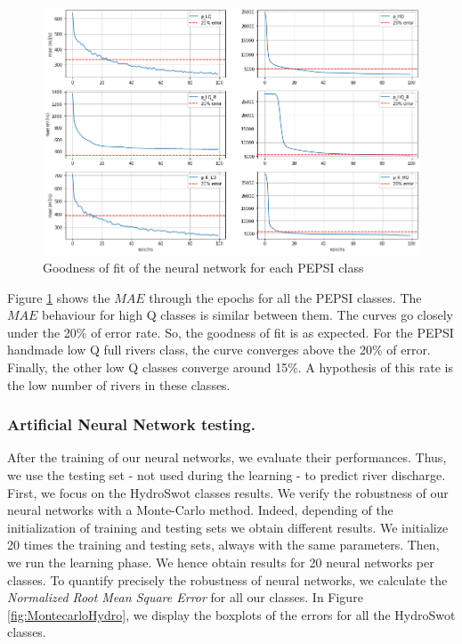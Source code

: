\begin{figure}[H]
    \centering
    \includegraphics[scale = 0.45] {Graph/mae_subplot_pepsi.png}
    \caption{Goodness of fit of the neural network for each PEPSI class}
    \label{fig:mae pepsi}
\end{figure}

Figure \ref{fig:mae pepsi} shows the $MAE$ through the epochs for all the PEPSI classes. 
The $MAE$ behaviour for high Q classes is similar between them. The curves go closely under the 20\% of error rate. So, the goodness of fit is as expected. For the PEPSI handmade low Q full rivers class, the curve converges above the 20\% of error. Finally, the other low Q classes converge around 15\%. A hypothesis of this rate is the low number of rivers in these classes.   

\subsubsection{Artificial Neural Network testing.}

After the training of our neural networks, we evaluate their performances. Thus, we use the testing set - not used during the learning - to predict river discharge. First, we focus on the HydroSwot classes results. We verify the robustness of our neural networks with a Monte-Carlo method. Indeed, depending of the initialization of training and testing sets we obtain different results.  We initialize 20 times the training and testing sets, always with the same parameters. Then, we run the learning phase. We hence obtain results for 20 neural networks per classes. To quantify precisely the robustness of neural networks, we calculate the \textit{Normalized Root Mean Square Error} for all our classes. In Figure \ref{fig:MontecarloHydro}, we display the boxplots of the errors for all the HydroSwot classes.

